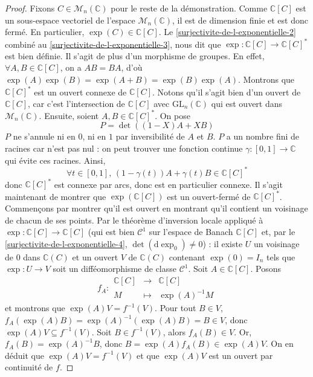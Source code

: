   \begin{proof}
    Fixons $C \in \mathcal{M}_n(\mathbb{C})$ pour le reste de la démonstration. Comme $\mathbb{C}[C]$ est un sous-espace vectoriel de l'espace $\mathcal{M}_n(\mathbb{C})$, il est de dimension finie et est donc fermé. En particulier, $\exp(C) \in \mathbb{C}[C]$. Le \cref{surjectivite-de-l-exponentielle-2} combiné au \cref{surjectivite-de-l-exponentielle-3}, nous dit que $\exp : \mathbb{C}[C] \rightarrow \mathbb{C}[C]^*$ est bien définie. Il s'agit de plus d'un morphisme de groupes. En effet, $\forall A, B \in \mathbb{C}[C]$, on a $AB=BA$, d'où $\exp(A)\exp(B) = \exp(A+B) = \exp(B)\exp(A)$.
    \newpar
    Montrons que $\mathbb{C}[C]^*$ est un ouvert connexe de $\mathbb{C}[C]$. Notons qu'il s'agit bien d'un ouvert de $\mathbb{C}[C]$, car c'est l'intersection de $\mathbb{C}[C]$ avec $\mathrm{GL}_n(\mathbb{C})$ qui est ouvert dans $\mathcal{M}_n(\mathbb{C})$. Ensuite, soient $A, B \in \mathbb{C}[C]^*$. On pose
    \[ P = \det((1-X)A+XB) \]
    $P$ ne s'annule ni en $0$, ni en $1$ par inversibilité de $A$ et $B$. $P$ a un nombre fini de racines car n'est pas nul : on peut trouver une fonction continue $\gamma : [0,1] \rightarrow \mathbb{C}$ qui évite ces racines. Ainsi,
    \[ \forall t \in [0,1], \, (1-\gamma(t))A + \gamma(t)B \in \mathbb{C}[C]^* \]
    donc $\mathbb{C}[C]^*$ est connexe par arcs, donc est en particulier connexe.
    \newpar
    Il s'agit maintenant de montrer que $\exp(\mathbb{C}[C])$ est un ouvert-fermé de $\mathbb{C}[C]^*$. Commençons par montrer qu'il est ouvert en montrant qu'il contient un voisinage de chacun de ses points. Par le théorème d'inversion locale appliqué à $\exp : \mathbb{C}[C] \rightarrow \mathbb{C}[C]$ (qui est bien $\mathcal{C}^1$ sur l'espace de Banach $\mathbb{C}[C]$ et, par le \cref{surjectivite-de-l-exponentielle-4}, $\det(\mathrm{d}\exp_0) \neq 0$) : il existe $U$ un voisinage de $0$ dans $\mathbb{C}(C)$ et un ouvert $V$ de $\mathbb{C}(C)$ contenant $\exp(0) = I_n$ tels que $\exp : U \rightarrow V$ soit un difféomorphisme de classe $\mathcal{C}^1$. Soit $A \in \mathbb{C}[C]$. Posons
    \[
      f_A :
      \begin{array}{ccc}
        \mathbb{C}[C] &\rightarrow& \mathbb{C}[C] \\
        M &\mapsto& \exp(A)^{-1}M
      \end{array}
    \]
    et montrons que $\exp(A)V = f^{-1}(V)$.
    Pour tout $B \in V$, $f_A(\exp(A)B) = \exp(A)^{-1}(\exp(A)B) = B \in V$, donc $\exp(A)V \subseteq f^{-1}(V)$.
    \newpar
    Soit $B \in f^{-1}(V)$, alors $f_A(B) \in V$. Or, $f_A(B) = \exp(A)^{-1}B$, donc $B = \exp(A)f_A(B) \in \exp(A)V$. On en déduit que $\exp(A)V = f^{-1}(V)$ et que $\exp(A)V$ est un ouvert par continuité de $f$.

\end{proof}

